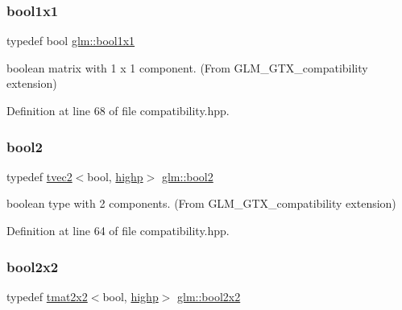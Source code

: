 \subsubsection{\texorpdfstring{bool1x1}{bool1x1}}
{\footnotesize\ttfamily typedef bool \mbox{\hyperlink{group__gtx__compatibility_ga98d9d3da22aebc872ba38ce5afa0eff7}{glm\+::bool1x1}}}



boolean matrix with 1 x 1 component. (From G\+L\+M\+\_\+\+G\+T\+X\+\_\+compatibility extension) 



Definition at line 68 of file compatibility.\+hpp.

\mbox{\label{group__gtx__compatibility_gabe088d78d539d2a98a2a04ab798fec1a}} 
\subsubsection{\texorpdfstring{bool2}{bool2}}
{\footnotesize\ttfamily typedef \mbox{\hyperlink{structglm_1_1tvec2}{tvec2}}$<$bool, \mbox{\hyperlink{namespaceglm_a0f04f086094c747d227af4425893f545ac6f7eab42eacbb10d59a58e95e362074}{highp}}$>$ \mbox{\hyperlink{group__gtx__compatibility_gabe088d78d539d2a98a2a04ab798fec1a}{glm\+::bool2}}}



boolean type with 2 components. (From G\+L\+M\+\_\+\+G\+T\+X\+\_\+compatibility extension) 



Definition at line 64 of file compatibility.\+hpp.

\mbox{\label{group__gtx__compatibility_gaeb49db4b236907ba11f5b9117274b5d8}} 
\subsubsection{\texorpdfstring{bool2x2}{bool2x2}}
{\footnotesize\ttfamily typedef \mbox{\hyperlink{structglm_1_1tmat2x2}{tmat2x2}}$<$bool, \mbox{\hyperlink{namespaceglm_a0f04f086094c747d227af4425893f545ac6f7eab42eacbb10d59a58e95e362074}{highp}}$>$ \mbox{\hyperlink{group__gtx__compatibility_gaeb49db4b236907ba11f5b9117274b5d8}{glm\+::bool2x2}}}



